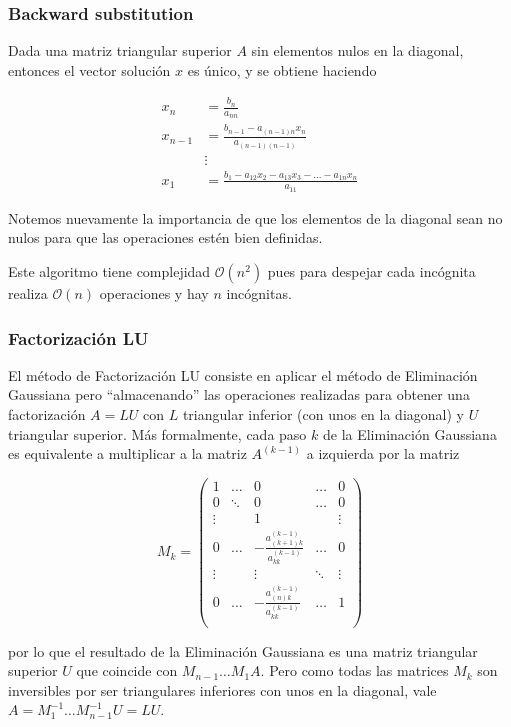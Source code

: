 \subsubsection{Backward substitution}
Dada una matriz triangular superior $A$ sin elementos nulos en la diagonal, entonces el vector solución $x$ es único, y se obtiene haciendo

\begin{align*}
x_n &= \frac{b_n}{a_{nn}}	\\
x_{n - 1} &= \frac{b_{n - 1} - a_{(n-1)n} x_n}{a_{(n-1)(n-1)}}	\\
&\vdots \\
x_1 &= \frac{b_1 - a_{12}x_2 - a_{13}x_3 - \ldots - a_{1n} x_n}{a_{11}}
\end{align*}

Notemos nuevamente la importancia de que los elementos de la diagonal sean no nulos para que las operaciones estén bien definidas.

Este algoritmo tiene complejidad $\mathcal{O}(n^2)$ pues para despejar cada incógnita realiza $\mathcal{O}(n)$ operaciones y hay $n$ incógnitas.

\subsubsection{Factorización LU}

El método de Factorización LU consiste en aplicar el método de Eliminación Gaussiana pero ``almacenando'' las operaciones realizadas para obtener una factorización $A = LU$ con $L$ triangular inferior (con unos en la diagonal) y $U$ triangular superior. Más formalmente, cada paso $k$ de la Eliminación Gaussiana es equivalente a multiplicar a la matriz $A^{(k-1)}$ a izquierda por la matriz

\[
M_k = 
\begin{pmatrix} 
1 		& \ldots 	& 0 				& \ldots 	& 0 \\
0 		& \ddots 	& 0 				& \ldots 	& 0 \\
\vdots 	& 			& 1 				& 			& \vdots\\
0		& \ldots		& -\frac{a_{(k+1)k}^{(k - 1)}}{a_{kk}^{(k - 1)}} 	& \ldots		& 0\\
\vdots	& 			& \vdots		 	& \ddots		& \vdots\\
0		& \ldots		& -\frac{a_{(n)k}^{(k - 1)}}{a_{kk}^{(k - 1)}}	& \ldots		& 1\\
\end{pmatrix}
\]

por lo que el resultado de la Eliminación Gaussiana es una matriz triangular superior $U$ que coincide con $M_{n-1} \ldots M_1 A$. Pero como todas las matrices $M_k$ son inversibles por ser triangulares inferiores con unos en la diagonal, vale $A = M_1^{-1}\ldots M_{n - 1}^{-1} U = LU$.

